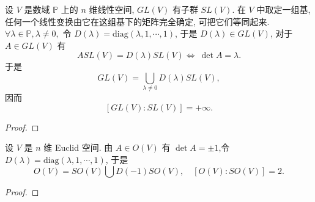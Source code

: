 \documentclass[../../main.tex]{subfiles}%
\begin{document}
\begin{example}
设 \( V \) 是数域 \( \mathbb{P} \) 上的 \( n \) 维线性空间, \( GL(V) \) 有子群 \( SL(V) \). 在 \( V \) 中取定一组基, 任何一个线性变换由它在这组基下的矩阵完全确定, 可把它们等同起来.\( \forall \lambda \in \mathbb{P}, \lambda \neq 0, \) 令 \( D(\lambda) = \text{diag}(\lambda, 1, \cdots, 1) \), 于是 \( D(\lambda) \in GL(V) \), 对于 \( A \in GL(V) \) 有
\[
A SL(V) = D(\lambda) SL(V)\iff \ \det A = \lambda.
\]
于是
\[
GL(V) = \bigcup_{\lambda \neq 0} D(\lambda) SL(V),
\]
因而
\[
[GL(V): SL(V)] = +\infty.
\]
\end{example}
\begin{proof}



\end{proof}

\begin{example}
设 \( V \) 是 \( n \) 维 Euclid 空间. 由 \( A \in O(V) \) 有 \( \det A = \pm 1 \),令 \( D(\lambda) = \text{diag}(\lambda, 1, \cdots, 1) \),  于是
\[
O(V) = SO(V) \bigcup D(-1) SO(V),
\quad
[O(V): SO(V)] = 2.
\]
\end{example}
\begin{proof}



\end{proof}
\end{document}
